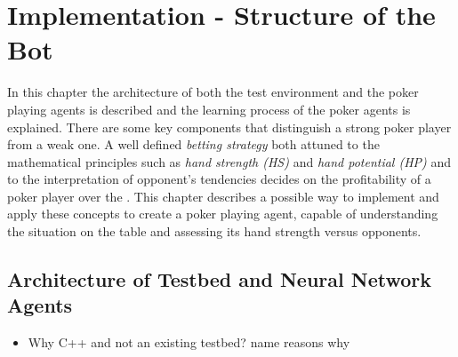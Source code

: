 
\chapter{Implementation - Structure of the Bot}
\label{cha:implementation}
In this chapter the architecture of both the test environment and the poker playing agents is described and the learning process of the poker agents is explained. There are some key components that distinguish a strong poker player from a weak one. A well defined \textit{betting strategy} both attuned to the mathematical principles such as \textit{hand strength (HS)} and \textit{hand potential (HP)} and to the interpretation of opponent's tendencies decides on the profitability of a poker player over the  \cite{opp_modeling}. This chapter describes a possible way to implement and apply these concepts to create a poker playing agent, capable of understanding the situation on the table and assessing its hand strength versus opponents. \pagebreak

\section{Architecture of Testbed and Neural Network Agents}
\label{sec:architecture}
\begin{itemize}
\item Why C++ and not an existing testbed?
\subitem name reasons why
\end{itemize}
\\\\

